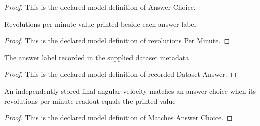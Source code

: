 \begin{proof}
  This is the declared model definition of Answer Choice.
\end{proof}
\begin{definition}
  \label{def:physics:phyx-mini-0712:phyxminiproblems-problemphyxmini0712-answerchoice-revolutionsperminute}
  Revolutions-per-minute value printed beside each answer label
\end{definition}
\begin{proof}
  This is the declared model definition of revolutions Per Minute.
\end{proof}
\begin{definition}
  \label{def:physics:phyx-mini-0712:phyxminiproblems-problemphyxmini0712-recordeddatasetanswer}
  The answer label recorded in the supplied dataset metadata
\end{definition}
\begin{proof}
  This is the declared model definition of recorded Dataset Answer.
\end{proof}
\begin{definition}
  \label{def:physics:phyx-mini-0712:phyxminiproblems-problemphyxmini0712-matchesanswerchoice}
  An independently stored final angular velocity matches an answer choice when its revolutions-per-minute readout equals the printed value
\end{definition}
\begin{proof}
  This is the declared model definition of Matches Answer Choice.
\end{proof}
